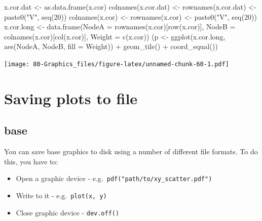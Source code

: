 \documentclass[
]{book}
\newenvironment{Shaded}{\begin{snugshade}}{\end{snugshade}}
\newcommand{\AttributeTok}[1]{\textcolor[rgb]{0.77,0.63,0.00}{#1}}
\newcommand{\DecValTok}[1]{\textcolor[rgb]{0.00,0.00,0.81}{#1}}
\newcommand{\FunctionTok}[1]{\textcolor[rgb]{0.00,0.00,0.00}{#1}}
\newcommand{\NormalTok}[1]{#1}
\newcommand{\OtherTok}[1]{\textcolor[rgb]{0.56,0.35,0.01}{#1}}
\newcommand{\SpecialCharTok}[1]{\textcolor[rgb]{0.00,0.00,0.00}{#1}}
\newcommand{\StringTok}[1]{\textcolor[rgb]{0.31,0.60,0.02}{#1}}
\providecommand{\tightlist}{%
  \setlength{\itemsep}{0pt}\setlength{\parskip}{0pt}}
\begin{document}
\begin{Shaded}
\begin{Highlighting}[]
\NormalTok{x.cor.dat }\OtherTok{\textless{}{-}} \FunctionTok{as.data.frame}\NormalTok{(x.cor)}
\FunctionTok{colnames}\NormalTok{(x.cor.dat) }\OtherTok{\textless{}{-}} \FunctionTok{rownames}\NormalTok{(x.cor.dat) }\OtherTok{\textless{}{-}} \FunctionTok{paste0}\NormalTok{(}\StringTok{"V"}\NormalTok{, }\FunctionTok{seq}\NormalTok{(}\DecValTok{20}\NormalTok{))}
\FunctionTok{colnames}\NormalTok{(x.cor) }\OtherTok{\textless{}{-}} \FunctionTok{rownames}\NormalTok{(x.cor) }\OtherTok{\textless{}{-}} \FunctionTok{paste0}\NormalTok{(}\StringTok{"V"}\NormalTok{, }\FunctionTok{seq}\NormalTok{(}\DecValTok{20}\NormalTok{))}
\NormalTok{x.cor.long }\OtherTok{\textless{}{-}} \FunctionTok{data.frame}\NormalTok{(}\AttributeTok{NodeA =} \FunctionTok{rownames}\NormalTok{(x.cor)[}\FunctionTok{row}\NormalTok{(x.cor)],}
                         \AttributeTok{NodeB =} \FunctionTok{colnames}\NormalTok{(x.cor)[}\FunctionTok{col}\NormalTok{(x.cor)],}
                         \AttributeTok{Weight =} \FunctionTok{c}\NormalTok{(x.cor))}
\NormalTok{(p }\OtherTok{\textless{}{-}} \FunctionTok{ggplot}\NormalTok{(x.cor.long, }\FunctionTok{aes}\NormalTok{(NodeA, NodeB, }\AttributeTok{fill =}\NormalTok{ Weight)) }\SpecialCharTok{+}
    \FunctionTok{geom\_tile}\NormalTok{() }\SpecialCharTok{+} \FunctionTok{coord\_equal}\NormalTok{())}
\end{Highlighting}
\end{Shaded}

\texttt{[image: 80-Graphics\_files/figure-latex/unnamed-chunk-60-1.pdf]}

\hypertarget{saving-plots-to-file}{%
\section{Saving plots to file}\label{saving-plots-to-file}}

\hypertarget{base-8}{%
\subsection{base}\label{base-8}}

You can save base graphics to disk using a number of different file formats. To do this, you have to:

\begin{itemize}
\tightlist
\item
  Open a graphic device - e.g.~\texttt{pdf("path/to/xy\_scatter.pdf")}
\item
  Write to it - e.g.~\texttt{plot(x,\ y)}
\item
  Close graphic device - \texttt{dev.off()}
\end{itemize}
\end{document}
